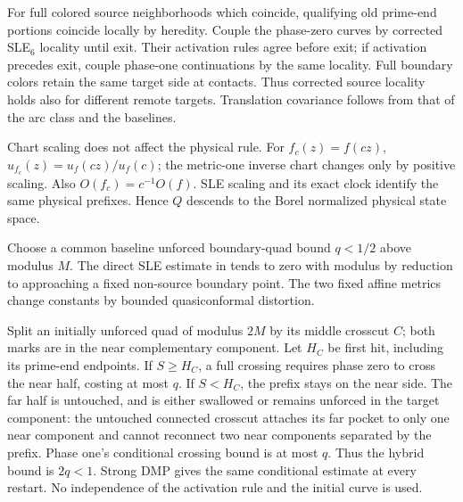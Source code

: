 For full colored source neighborhoods which coincide, qualifying
old prime-end portions coincide locally by heredity. Couple the
phase-zero curves by corrected SLE$_6$ locality until exit.
Their activation rules agree before exit; if activation precedes
exit, couple phase-one continuations by the same locality.
Full boundary colors retain the same target side at contacts.
Thus corrected source locality holds also for different remote
targets. Translation covariance follows from that of the arc
class and the baselines.

Chart scaling does not affect the physical rule.
For $f_c(z)=f(cz)$,
$u_{f_c}(z)=u_f(cz)/u_f(c)$; the metric-one inverse chart changes
only by positive scaling. Also $O(f_c)=c^{-1}O(f)$.
SLE scaling and its exact clock identify the same physical prefixes.
Hence $Q$ descends to the Borel normalized physical state space.

Choose a common baseline unforced boundary-quad bound $q<1/2$
above modulus $M$. The direct SLE estimate in
\cite[Section 1.4, proof of Theorem 1.10]{ks} tends to zero with
modulus by reduction to approaching a fixed non-source boundary
point. The two fixed affine metrics change constants by bounded
quasiconformal distortion.

Split an initially unforced quad of modulus $2M$ by its middle
crosscut $C$; both marks are in the near complementary component.
Let $H_C$ be first hit, including its prime-end endpoints.
If $S\ge H_C$, a full crossing requires phase zero to cross the
near half, costing at most $q$.
If $S<H_C$, the prefix stays on the near side. The far half is
untouched, and is either swallowed or remains unforced in the
target component: the untouched connected crosscut attaches its far
pocket to only one near component and cannot reconnect two near
components separated by the prefix. Phase one's conditional crossing
bound is at most $q$. Thus the hybrid bound is $2q<1$.
Strong DMP gives the same conditional estimate at every restart.
No independence of the activation rule and the initial curve is used.

